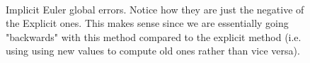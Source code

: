 \documentclass[a4paper, 11pt]{article}
\begin{document}
 \begin{figure}[H]
\\
\caption{Implicit Euler global errors. Notice how they are just the negative of the Explicit ones. This makes sense since we are essentially going "backwards" with this method compared to the explicit method (i.e. using using new values to compute old ones rather than vice versa). }
\end{figure}
\end{document}
